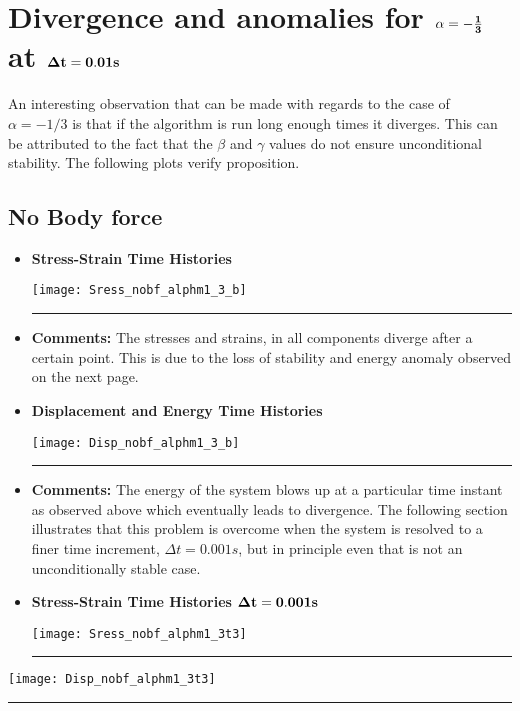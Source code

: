 \section*{Divergence and anomalies for $\bf\alpha=-\frac{1}{3}$ at $\bf\Delta t = 0.01s$}
An interesting observation that can be made with regards to the case of $\alpha = -1/3$ is that if the algorithm is run long enough times it diverges. This can be attributed to the fact that the $\beta$ and $\gamma$ values do not ensure unconditional stability. The following plots verify proposition. 
\subsection*{No Body force}
\begin{itemize}
\item {\bf Stress-Strain Time Histories} 
\begin{center}
\texttt{[image: Sress\_nobf\_alphm1\_3\_b]}
\end{center}\hrule
\item {\bf Comments: } The stresses and strains, in all components diverge after a certain point. This is due to the loss of stability and energy anomaly observed on the next page. 
\newpage
\item {\bf Displacement and Energy Time Histories}
\begin{center}
\texttt{[image: Disp\_nobf\_alphm1\_3\_b]}
\end{center}\hrule
\item {\bf Comments: } The energy of the system blows up at a particular time instant as observed above which eventually leads to divergence. The following section illustrates that this problem is overcome when the system is resolved to a finer time increment, $\Delta t = 0.001s$, but in principle even that is not an unconditionally stable case. 
\newpage
\item {\bf Stress-Strain Time Histories $\bf\Delta t = 0.001s$} 
\begin{center}
\texttt{[image: Sress\_nobf\_alphm1\_3t3]}
\end{center}\hrule 
\end{itemize}
\begin{center}
\texttt{[image: Disp\_nobf\_alphm1\_3t3]}
\end{center}\hrule